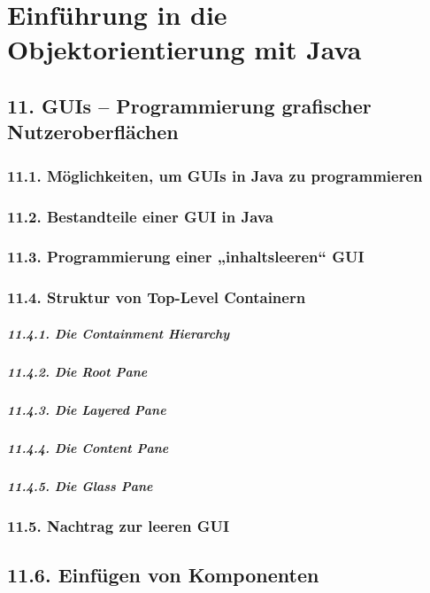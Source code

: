 \chapter{Einführung in die Objektorientierung mit Java}
\section{11.	GUIs – Programmierung grafischer Nutzeroberflächen}
\subsection{11.1.	Möglichkeiten, um GUIs in Java zu programmieren}
\subsection{11.2.	Bestandteile einer GUI in Java}
\subsection{11.3.	Programmierung einer „inhaltsleeren“ GUI}
\subsection{11.4.	Struktur von Top-Level Containern}
\paragraph{11.4.1.	Die Containment Hierarchy}
\paragraph{11.4.2.	Die Root Pane}
\paragraph{11.4.3.	Die Layered Pane}
\paragraph{11.4.4.	Die Content Pane}
\paragraph{11.4.5.	Die Glass Pane}
\subsection{11.5.	Nachtrag zur leeren GUI}
\section{11.6.	Einfügen von Komponenten}
